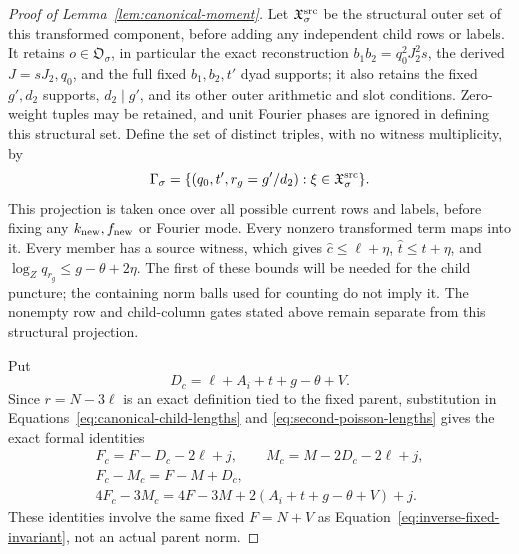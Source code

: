\documentclass[11pt,a4paper]{article}
\numberwithin{equation}{section}
\numberwithin{figure}{section}
\theoremstyle{definition}
\theoremstyle{remark}
\begin{document}
\begin{proof}[Proof of Lemma~\ref{lem:canonical-moment}]
Let \(\mathfrak X_\sigma^{\rm src}\) be the structural outer set of
this transformed component, before adding any independent child rows
or labels.  It retains
\(o\in\mathfrak O_\sigma\), in particular the exact reconstruction
\(b_1b_2=q_0^2J_2^2s\), the derived \(J=sJ_2,q_0\), and the full
fixed \(b_1,b_2,t'\) dyad supports; it also retains the fixed
\(g',d_2\) supports, \(d_2\mid g'\), and its other outer arithmetic
and slot conditions.  Zero-weight tuples may be retained, and unit
Fourier phases are ignored in defining this structural set.  Define
the set of distinct triples, with no witness multiplicity, by
\begin{equation}\label{eq:inverse-source-triples}
 \Gamma_\sigma=
 \{(q_0,t',r_g=g'/d_2):\xi\in\mathfrak X_\sigma^{\rm src}\}.
\end{equation}
This projection is taken once over all possible current rows and
labels, before fixing any \(k_{\rm new},f_{\rm new}\) or Fourier
mode.  Every nonzero transformed term maps into it.  Every member
has a source witness, which gives
\(\widehat c\le\ell+\eta\), \(\widehat t\le t+\eta\), and
\(\log_Zq_{r_g}\le g-\theta+2\eta\).  The first of these bounds
will be needed for the child puncture; the containing norm balls
used for counting do not imply it.  The nonempty row and child-column gates stated above
remain separate from this structural projection.

Put
\[
 D_c=\ell+A_i+t+g-\theta+V.
\]
Since \(r=N-3\ell\) is an exact definition tied to the fixed parent,
substitution in Equations~\eqref{eq:canonical-child-lengths} and
\eqref{eq:second-poisson-lengths} gives the exact formal identities
\begin{equation}\label{eq:canonical-transition}
 \begin{gathered}
 F_c=F-D_c-2\ell+j,\qquad M_c=M-2D_c-2\ell+j,\\
 F_c-M_c=F-M+D_c,\\
 4F_c-3M_c=4F-3M+2(A_i+t+g-\theta+V)+j.
 \end{gathered}
\end{equation}
These identities involve the same fixed \(F=N+V\) as
Equation~\eqref{eq:inverse-fixed-invariant}, not an actual parent norm.


\end{proof}
\end{document}
